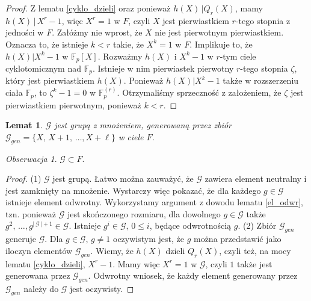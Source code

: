 \documentclass[declaration,shortabstract]{iithesis}
\theoremstyle{definition}
\theoremstyle{remark} \newtheorem{observation}{Obserwacja}
\theoremstyle{plain} \newtheorem{theorem}{Twierdzenie}
\theoremstyle{plain} \newtheorem{lemma}{Lemat}
\theoremstyle{remark} \newtheorem*{remark*}{Uwaga}
\theoremstyle{reminder} \newtheorem*{reminder*}{Przypomnienie}
\begin{document}
\begin{proof}
	Z lematu \ref{cyklo_dzieli} oraz ponieważ $h(X) \, | Q_r(X)$, mamy $h(X) \, | \, X^r - 1$, więc $X^r = 1$ w $F$, czyli $X$ jest pierwiastkiem $r$-tego stopnia z jedności w $F$. Załóżmy nie wprost, że $X$ nie jest pierwotnym pierwiastkiem. Oznacza to, że istnieje $k < r$ takie, że $X^k = 1$ w $F$. Implikuje to, że $h(X) | X^k - 1$ w $\mathbb{F}_p[X]$. Rozważmy $h(X)$ i $X^k - 1$ w $r$-tym ciele cyklotomicznym nad $\mathbb{F}_p$. Istnieje w nim pierwiastek pierwotny $r$-tego stopnia $\zeta$, który jest pierwiastkiem $h(X)$. Ponieważ $h(X) | X^k - 1$ także w rozszerzeniu ciała $\mathbb{F}_p$, to $\zeta^k - 1 = 0$ w $\mathbb{F}_p^{(r)}$. Otrzymaliśmy sprzeczność z założeniem, że $\zeta$ jest pierwiastkiem pierwotnym, ponieważ $k < r$.
\end{proof}

\begin{lemma}
	$\mathcal{G}$ jest grupą z mnożeniem, generowaną przez zbiór $\mathcal{G}_{gen} = \{X, \, X + 1, \, \dots, X + \ell\}$ w ciele $F$.
\end{lemma}
	
\begin{observation}
	$\mathcal{G} \subset F$.
\end{observation}
	
\begin{proof}
	(1) $\mathcal{G}$ jest grupą. Łatwo można zauważyć, że $\mathcal{G}$ zawiera element neutralny i jest zamknięty na mnożenie. Wystarczy więc pokazać, że dla każdego $g \in \mathcal{G}$ istnieje element odwrotny. Wykorzystamy argument z dowodu lematu \ref{el_odwr}, tzn. ponieważ $\mathcal{G}$ jest skończonego rozmiaru, dla dowolnego $g \in \mathcal{G}$ także $g^2, \, \dots, g^{| \,  \mathcal{G}\, | + 1}\in \mathcal{G}$. Istnieje $g^i \in \mathcal{G}, \,0 \leq i$, będące odwrotnością $g$.\newline
	(2) Zbiór $\mathcal{G}_{gen}$ generuje $\mathcal{G}$. Dla $g \in \mathcal{G}, \, g \neq 1$ oczywistym jest, że $g$ można przedstawić jako iloczyn elementów $\mathcal{G}_{gen}$. Wiemy, że $h(X)$ dzieli $Q_r(X)$, czyli też, na mocy lematu \ref{cyklo_dzieli}, $X^r - 1$. Mamy więc $X^r = 1$ w $\mathcal{G}$, czyli $1$ także jest generowana przez $\mathcal{G}_{gen}$. Odwrotny wniosek, że każdy element generowany przez $\mathcal{G}_{gen}$ należy do $\mathcal{G}$ jest oczywisty.
\end{proof}
		
\end{document}
